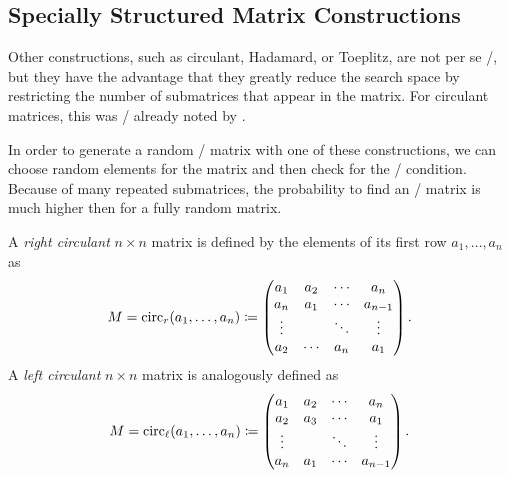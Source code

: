 \subsection{Specially Structured Matrix Constructions}

Other constructions, such as circulant, Hadamard, or Toeplitz, are not per se \MDS/, but they have the advantage that they greatly reduce the search space by restricting the number of submatrices that appear in the matrix.
For circulant matrices, this was \eg/ already noted by \textcite{FSE:DaeKnuRij97}.

In order to generate a random \MDS/ matrix with one of these constructions, we can choose random elements for the matrix and then check for the \MDS/ condition.
Because of many repeated submatrices, the probability to find an \MDS/ matrix is much higher then for a fully random matrix.

\begin{definition}
    A \emph{right circulant} $n \times n$ matrix is defined by the elements of its first row $a_1, \ldots, a_n$ as
    \begin{equation*}
        M = \operatorname{circ}_r(a_1, \ldots, a_n) \coloneqq \begin{pmatrix}
            a_1    & a_2    & \cdots & a_n     \\
            a_n    & a_1    & \cdots & a_{n-1} \\
            \vdots &        & \ddots & \vdots  \\
            a_2    & \cdots & a_n    & a_1     \\
        \end{pmatrix}.
    \end{equation*}
    A \emph{left circulant} $n \times n$ matrix is analogously defined as
    \begin{equation*}
        M = \operatorname{circ}_{\ell}(a_1, \ldots, a_n) \coloneqq \begin{pmatrix}
            a_1    & a_2    & \cdots & a_n     \\
            a_2    & a_3    & \cdots & a_1     \\
            \vdots &        & \ddots & \vdots  \\
            a_n    & a_1    & \cdots & a_{n-1} \\
        \end{pmatrix}.
    \end{equation*}
\end{definition}

